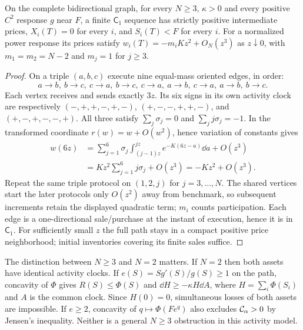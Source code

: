 \documentclass[review,hidelinks,onefignum,onetabnum]{siamonline250211}%
\begin{document}
\begin{theorem}\label{thm:triangle}
On the complete bidirectional graph, for every $N\ge3$, $\kappa>0$
and every positive $C^2$ response $g$ near $F$, a finite $\mathsf C_1$
sequence has strictly positive intermediate prices,
$X_i(T)=0$ for every $i$, and $S_i(T)<F$ for every $i$.
For a normalized power response its prices satisfy
$w_i(T)=-m_iKz^2+O_N(z^3)$ as $z\downarrow0$, with
$m_1=m_2=N-2$ and $m_j=1$ for $j\ge3$.
\end{theorem}
\begin{proof}
On a triple $(a,b,c)$ execute nine equal-mass oriented edges, in order:
\[
 a\to b,\ b\to c,\ c\to a,\ b\to c,\ c\to a,\ a\to b,\ c\to a,\ a\to b,\ b\to c.
\]
Each vertex receives and sends exactly $3z$. Its six signs in its own
activity clock are respectively
$(-,+,+,-,+,-)$, $(+,-,-,+,+,-)$, and $(+,-,+,-,-,+)$.
All three satisfy $\sum_j\sigma_j=0$ and $\sum_jj\sigma_j=-1$.
In the transformed coordinate $r(w)=w+O(w^2)$, hence variation of
constants gives
\begin{align*}
 w(6z)&=\sum_{j=1}^6\sigma_j
 \int_{(j-1)z}^{jz}e^{-K(6z-a)}\dd a+O(z^3)\\
 &=Kz^2\sum_{j=1}^6j\sigma_j+O(z^3)=-Kz^2+O(z^3).
\end{align*}
Repeat the same triple protocol on $(1,2,j)$ for $j=3,\ldots,N$.
The shared vertices start the later protocols only $O(z^2)$ away from
benchmark, so subsequent increments retain the displayed quadratic
term; $m_i$ counts participation. Each edge is a one-directional sale/purchase
at the instant of execution, hence it is in $\mathsf C_1$. For sufficiently
small $z$ the full path stays in a compact positive price neighborhood;
initial inventories covering its finite sales suffice.
\end{proof}

\begin{remark}
The distinction between $N\ge3$ and $N=2$ matters. If $N=2$ then both
assets have identical activity clocks. If $e(S)=Sg'(S)/g(S)\ge1$ on the path,
concavity of $\Phi$ gives $R(S)\le\Phi(S)$ and
$\dd H\ge-\kappa H\dd A$, where $H=\sum_i\Phi(S_i)$ and $A$ is the common
clock. Since $H(0)=0$, simultaneous losses of both assets are impossible.
If $e\ge2$, concavity of $q\mapsto\Phi(Fe^q)$ also excludes
$\mathcal{C}_\alpha>0$ by Jensen's inequality. Neither is a general
$N\ge3$ obstruction in this activity model.
\end{remark}
\end{document}
